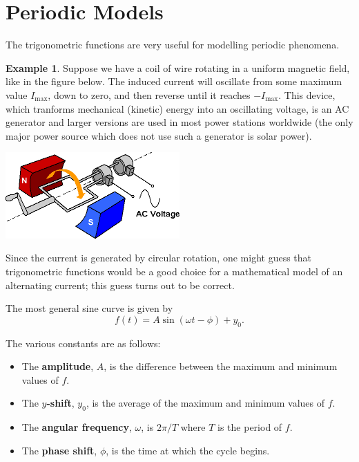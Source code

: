 \documentclass[a4paper,leqno]{article}
\numberwithin{equation}{section}
\theoremstyle{definition}
\newtheorem{ex}[equation]{Example}
\theoremstyle{remark}
\newcommand{\df}[1]{\textbf{#1}}
\begin{document}
\section{Periodic Models}
The trigonometric functions are very useful for modelling periodic phenomena.
\begin{ex}
  Suppose we have a coil of wire rotating in a uniform magnetic field, like in the figure below. The induced current will oscillate
  from some maximum value $ I_\text{max} $, down to zero, and then reverse until it reaches $ -I_\text{max} $. This device, which tranforms
  mechanical (kinetic) energy into an oscillating voltage, is an AC generator and larger versions are used in most power stations
  worldwide (the only major power source which does not use such a generator is solar power).

  \begin{center}
    \includegraphics[width=0.5\textwidth]{acgenerator}
  \end{center}

  Since the current is generated by circular rotation, one might guess that trigonometric functions would be a good choice for
  a mathematical model of an alternating current; this guess turns out to be correct.
\end{ex}

The most general sine curve is given by
\begin{equation}
  f(t) = A\sin(\omega t - \phi) + y_0.
\end{equation}

The various constants are as follows:
\begin{itemize}
  \item The \df{amplitude}, $ A $, is the difference between the maximum and minimum values of $ f $.
  \item The \df{$ y$-shift}, $ y_0 $, is the average of the maximum and minimum values of $ f $.
  \item The \df{angular frequency}, $ \omega $, is $ 2\pi/T $ where $ T $ is the period of $ f $.
  \item The \df{phase shift}, $ \phi $, is the time at which the cycle begins.
\end{itemize}
\end{document}
